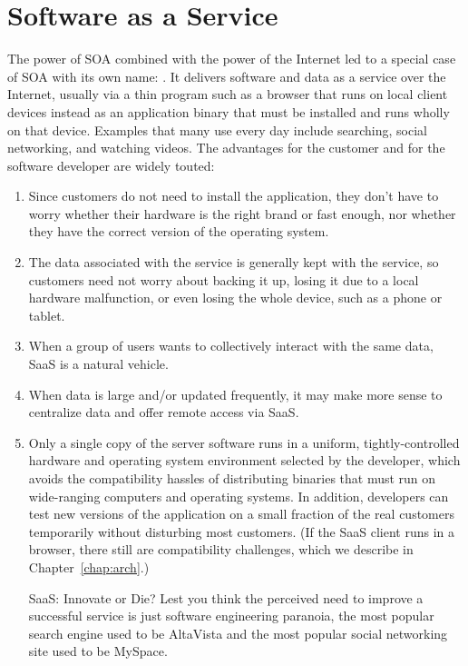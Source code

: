 \section{Software as a Service}

The power of SOA combined with the power of the Internet led to a special case of SOA with its own name:
. It delivers software and data as a service over the Internet, usually via a thin program such as a browser that runs on local client devices instead as an application binary that must be installed and runs wholly on that device.  Examples that many use every day include searching, social networking, and watching videos.
The advantages for the customer and for the software developer are widely touted:

\begin{enumerate}

\item Since customers do not need to install the application, they don't have to worry whether their hardware is the right brand or fast enough, nor whether they have the correct version of the operating system.

\item The data associated with the service is generally kept with the service, so customers need not worry about backing it up, losing it due to a local hardware malfunction, or even losing the whole device, such as a phone or tablet.

\item When a group of users wants to collectively interact with the same data, SaaS is a natural vehicle.

\item When data is large and/or updated frequently, it may make more sense to centralize data and offer remote access via SaaS.

\item Only a single copy of the server software runs in a uniform, tightly-controlled hardware and operating system environment selected by the developer, which avoids the compatibility hassles of distributing binaries that must run on wide-ranging computers and operating systems. In addition, developers can test new versions of the application on a small fraction of the real customers temporarily without disturbing most customers. (If the SaaS client runs in a browser, there still are compatibility challenges, which we describe in Chapter~\ref{chap:arch}.) \begin{sidebar}[0.0in]{SaaS: Innovate or Die?}
Lest you think the perceived need to improve a successful service is just software engineering paranoia, the most popular search engine used to be AltaVista and the most popular social networking site used to be MySpace.
\end{sidebar}


\end{enumerate}

